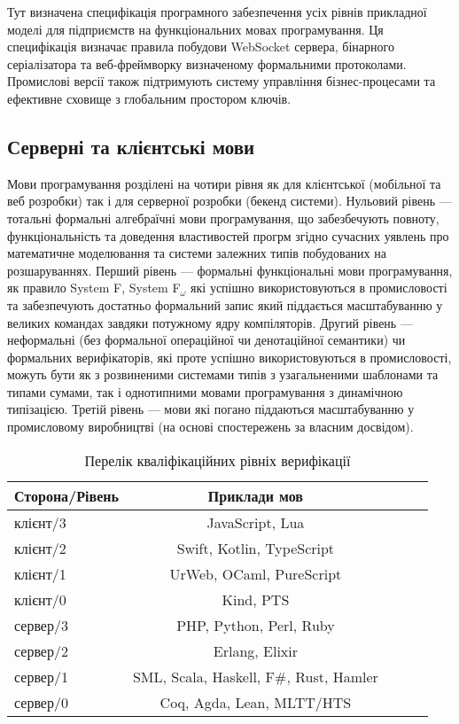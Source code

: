 Тут визначена специфікація програмного забезпечення усіх рівнів прикладної моделі
для підприємств на функціональних мовах програмування.
Ця специфікація визначає правила побудови WebSocket сервера,
бінарного серіалізатора та веб-фреймворку визначеному
формальними протоколами. Промислові версії також підтримують
систему управління бізнес-процесами та ефективне сховище
з глобальним простором ключів.

\subsection*{Серверні та клієнтські мови}
Мови програмування розділені на чотири рівня як для клієнтської
(мобільної та веб розробки) так і для серверної розробки (бекенд
системи). Нульовий рівень — тотальні формальні алгебраїчні мови
програмування, що забезбечують повноту, функціональність та доведення
властивостей прогрм згідно сучасних уявлень про математичне моделювання
та системи залежних типів побудованих на розшаруваннях. Перший
рівень — формальні функціональні мови програмування, як правило
System F, System F$_\omega$ які успішно використовуються в промисловості
та забезпечують достатньо формальний запис який піддається
масштабуванню у великих командах завдяки потужному ядру компіляторів.
Другий рівень — неформальні (без формальної операційної чи денотаційної
семантики) чи формальних верифікаторів, які проте успішно
використовуються в промисловості, можуть бути як з розвиненими
системами типів з узагальненими шаблонами та типами сумами,
так і однотипними мовами програмування з динамічною типізацією.
Третій рівень — мови які погано піддаються масштабуванню у
промисловому виробництві (на основі спостережень за власним досвідом).

\begin{table}[ht]
\begin{center}
\caption{Перелік кваліфікаційних рівніх верифікації}
\begin{tabular}{lcccc}
\hline
\textbf{Сторона/Рівень} & \textbf{Приклади мов} \\
\hline
    клієнт/3 & JavaScript, Lua \\
    клієнт/2 & Swift, Kotlin, TypeScript \\
    клієнт/1 & UrWeb, OCaml, PureScript \\
    клієнт/0 & Kind, PTS \\
    \hline
    сервер/3 & PHP, Python, Perl, Ruby \\
    сервер/2 & Erlang, Elixir \\
    сервер/1 & SML, Scala, Haskell, F\#, Rust, Hamler \\
    сервер/0 & Coq, Agda, Lean, MLTT/HTS \\
\hline
\end{tabular}
\end{center}
\end{table}

